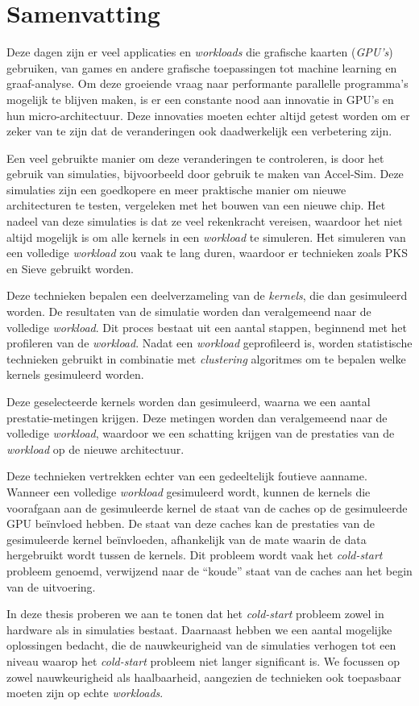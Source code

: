\chapter*{Samenvatting}
Deze dagen zijn er veel applicaties en \textit{workloads} die grafische kaarten (\textit{GPU's}) gebruiken, van games en andere grafische toepassingen tot machine learning en graaf-analyse.
Om deze groeiende vraag naar performante parallelle programma's mogelijk te blijven maken, is er een constante nood aan innovatie in GPU's en hun micro-architectuur.
Deze innovaties moeten echter altijd getest worden om er zeker van te zijn dat de veranderingen ook daadwerkelijk een verbetering zijn.

Een veel gebruikte manier om deze veranderingen te controleren, is door het gebruik van simulaties, bijvoorbeeld door gebruik te maken van Accel-Sim.
Deze simulaties zijn een goedkopere en meer praktische manier om nieuwe architecturen te testen, vergeleken met het bouwen van een nieuwe chip.
Het nadeel van deze simulaties is dat ze veel rekenkracht vereisen, waardoor het niet altijd mogelijk is om alle kernels in een \textit{workload} te simuleren.
Het simuleren van een volledige \textit{workload} zou vaak te lang duren, waardoor er technieken zoals PKS en Sieve gebruikt worden.

Deze technieken bepalen een deelverzameling van de \textit{kernels}, die dan gesimuleerd worden.
De resultaten van de simulatie worden dan veralgemeend naar de volledige \textit{workload}.
Dit proces bestaat uit een aantal stappen, beginnend met het profileren van de \textit{workload}.
Nadat een \textit{workload} geprofileerd is, worden statistische technieken gebruikt in combinatie met \textit{clustering} algoritmes om te bepalen welke kernels gesimuleerd worden.

Deze geselecteerde kernels worden dan gesimuleerd, waarna we een aantal prestatie-metingen krijgen.
Deze metingen worden dan veralgemeend naar de volledige \textit{workload}, waardoor we een schatting krijgen van de prestaties van de \textit{workload} op de nieuwe architectuur.

Deze technieken vertrekken echter van een gedeeltelijk foutieve aanname.
Wanneer een volledige \textit{workload} gesimuleerd wordt, kunnen de kernels die voorafgaan aan de gesimuleerde kernel de staat van de caches op de gesimuleerde GPU beïnvloed hebben.
De staat van deze caches kan de prestaties van de gesimuleerde kernel beïnvloeden, afhankelijk van de mate waarin de data hergebruikt wordt tussen de kernels.
Dit probleem wordt vaak het \textit{cold-start} probleem genoemd, verwijzend naar de ``koude'' staat van de caches aan het begin van de uitvoering.

In deze thesis proberen we aan te tonen dat het \textit{cold-start} probleem zowel in hardware als in simulaties bestaat.
Daarnaast hebben we een aantal mogelijke oplossingen bedacht, die de nauwkeurigheid van de simulaties verhogen tot een niveau waarop het \textit{cold-start} probleem niet langer significant is.
We focussen op zowel nauwkeurigheid als haalbaarheid, aangezien de technieken ook toepasbaar moeten zijn op echte \textit{workloads}.